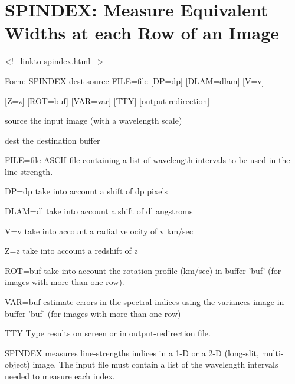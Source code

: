 \section{SPINDEX: Measure Equivalent Widths at each Row of an Image}
\begin{rawhtml}
<!-- linkto spindex.html -->
\end{rawhtml}
\begin{command}
  \item[Form: SPINDEX dest source FILE=file {[DP=dp]} {[DLAM=dlam]} 
       {[V=v]}\hfill]{}
  \item{{[Z=z]} {[ROT=buf]} {[VAR=var]} {[TTY]} {[output-redirection]}}
  \item[source]{the input image (with a wavelength scale)}
  \item[dest]{the destination buffer}
  \item[FILE=file]{ASCII file containing a list of wavelength intervals
       to be used in the line-strength.}
  \item[DP=dp]{take into account a shift of dp pixels}
  \item[DLAM=dl]{take into account a shift of dl angstroms}
  \item[V=v]{take into account a radial velocity of v km/sec}
  \item[Z=z]{take into account a redshift of z}
  \item[ROT=buf]{take into account the rotation profile (km/sec)
       in buffer 'buf' (for images with more than one row).}
  \item[VAR=buf]{estimate errors in the spectral indices using the
       variances image in buffer 'buf' (for images with more
       than one row)}
  \item[TTY]{Type results on screen or in output-redirection file.}
\end{command}

SPINDEX measures line-strengths indices in a 1-D or a 2-D (long-slit,
multi-object) image. The input file must contain a list of the wavelength
intervals needed to measure each index. 

